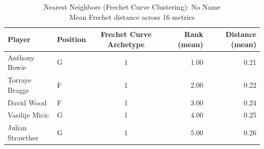 \begin{table}[t]
\caption*{
{\fontsize{20}{25} Nearest Neighbors (Frechet Curve Clustering): No Name\fontsize{12}{15}\selectfont } \\ 
{\fontsize{14}{17}\selectfont  Mean Frechet distance across 16 metrics\fontsize{12}{15}\selectfont }
} 
\fontsize{12.0pt}{14.0pt}\selectfont
\begin{tabular*}{\linewidth}{@{\extracolsep{\fill}}llcrr}
\toprule
Player & Position & Frechet Curve Archetype & Rank (mean) & Distance (mean) \\ 
\midrule\addlinespace[2.5pt]
Anthony Bowie & G & 1 & 1.00 & 0.21 \\ 
Torraye Braggs & F & 1 & 2.00 & 0.22 \\ 
David Wood & F & 1 & 3.00 & 0.24 \\ 
Vasilije Micic & G & 1 & 4.00 & 0.25 \\ 
Julian Strawther & G & 1 & 5.00 & 0.26 \\ 
\bottomrule
\end{tabular*}
\end{table}

